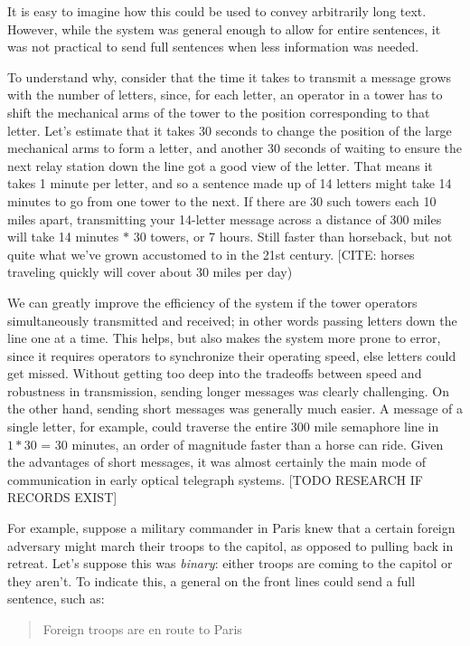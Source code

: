 \documentclass[UTF8]{book}
\begin{document}
\begin{CJK}{UTF8}{gbsn}
It is easy to imagine how this could be used to convey arbitrarily long text. However, while the system was general enough to allow for entire sentences, it was not practical to send full sentences when less information was needed.

To understand why, consider that the time it takes to transmit a message grows with the number of letters, since, for each letter, an operator in a tower has to shift the mechanical arms of the tower to the position corresponding to that letter. Let's estimate that it takes 30 seconds to change the position of the large mechanical arms to form a letter, and another 30 seconds of waiting to ensure the next relay station down the line got a good view of the letter. That means it takes 1 minute per letter, and so a sentence made up of 14 letters might take 14 minutes to go from one tower to the next. If there are 30 such towers each 10 miles apart, transmitting your 14-letter message across a distance of 300 miles will take 14 minutes $*$ 30 towers, or 7 hours. Still faster than horseback, but not quite what we've grown accustomed to in the 21st century. [CITE: horses traveling quickly will cover about 30 miles per day) 

We can greatly improve the efficiency of the system if the tower operators simultaneously transmitted and received; in other words passing letters down the line one at a time. This helps, but also makes the system more prone to error, since it requires operators to synchronize their operating speed, else letters could get missed. Without getting too deep into the tradeoffs between speed and robustness in transmission, sending longer messages was clearly challenging. On the other hand, sending short messages was generally much easier. A message of a single letter, for example, could traverse the entire 300 mile semaphore line in $1 * 30$ = 30 minutes, an order of magnitude faster than a horse can ride. Given the advantages of short messages, it was almost certainly the main mode of communication in early optical telegraph systems. [TODO RESEARCH IF RECORDS EXIST]

For example, suppose a military commander in Paris knew that a certain foreign adversary might march their troops to the capitol, as opposed to pulling back in retreat. Let's suppose this was \emph{binary}: either troops are coming to the capitol or they aren't. To indicate this, a general on the front lines could send a full sentence, such as:

\begin{quotation}
Foreign troops are en route to Paris
\end{quotation}


\end{CJK}
\end{document}
